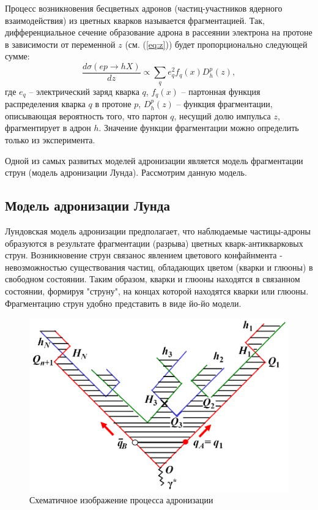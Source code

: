\documentclass{extarticle}
\begin{document}
Процесс возникновения бесцветных адронов (частиц-участников ядерного взаимодействия) из цветных кварков называется фрагментацией. Так, дифференциальное сечение образование адрона в рассеянии электрона на протоне в зависимости от переменной $z$ (см. (\ref{eq:z})) будет пропорционально следующей сумме:
\begin{equation}
	\frac{d\sigma(ep \rightarrow hX)}{dz} \propto \sum_q e_q^2 f_q (x) D_h^p(z),
\end{equation}
где $e_q$ -- электрический заряд кварка $q$, $f_q (x)$ -- партонная функция распределения кварка $q$ в протоне $p$, $D_h^p(z)$ -- функция фрагментации, описывающая вероятность того, что партон $q$, несущий долю импульса $z$, фрагментирует в адрон $h$. Значение функции фрагментации можно определить только из эксперимента.

Одной из самых развитых моделей адронизации является модель фрагментации струн (модель адронизации Лунда). Рассмотрим данную модель.
\subsection{Модель адронизации Лунда}
Лундовская модель адронизации предполагает, что наблюдаемые частицы-адроны образуются в результате фрагментации (разрыва) цветных кварк-антикварковых струн. Возникновение струн связанос явлением цветового конфайнмента - невозможностью существования частиц, обладающих цветом (кварки и глюоны) в свободном состоянии. Таким образом, кварки и глюоны находятся в связанном состоянии, формируя "струну", на концах которой находятся кварки или глюоны. Фрагментацию струн удобно представить в виде йо-йо модели. 
\begin{figure}[ht]
    \centering
    \includegraphics[width = 0.7\linewidth]{fragmentation.png}
    \caption{Схематичное изображение процесса адронизации \cite{LUND}}
    \label{fig:hadronization}
\end{figure} 
\end{document}
